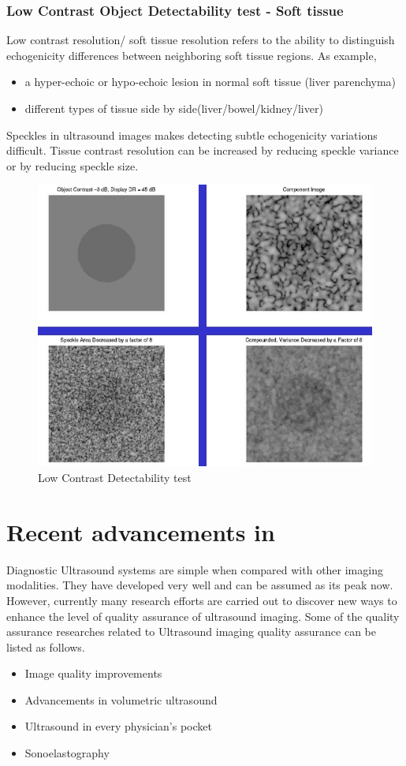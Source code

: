 \documentclass[12pt]{article}
\makeatletter
\let\thetitle\@title
\makeatother
\begin{document}
\subsubsection{Low Contrast Object Detectability test - Soft tissue}
Low contrast resolution/ soft tissue resolution refers to the ability to distinguish echogenicity differences between neighboring soft tissue regions. 
As example,
\begin{itemize}
    \item a hyper-echoic or hypo-echoic lesion in normal soft tissue (liver parenchyma)
    \item different types of tissue side by side(liver/bowel/kidney/liver)
\end{itemize}

Speckles in ultrasound images makes detecting subtle echogenicity variations difficult. Tissue contrast resolution can be increased by reducing speckle variance or by reducing speckle size.
\begin{figure}[!h]
    \centering
    \includegraphics[width=0.8\linewidth]{low.jpg}
    \caption{\small{Low Contrast Detectability test}}
    \label{fig:Low Contrast Detectability test}
\end{figure}

\pagebreak
\section{Recent advancements in \thetitle}
Diagnostic Ultrasound systems are simple when compared with other imaging modalities. They have developed very well and can be assumed as its peak now. However, currently many research efforts are carried out to discover new ways to enhance the level of quality assurance of ultrasound imaging. Some of the quality assurance researches related to Ultrasound imaging quality assurance can be listed as follows. 
\begin{itemize}
    \item Image quality improvements
    \item Advancements in volumetric ultrasound
    \item Ultrasound in every physician’s pocket
    \item Sonoelastography
\end{itemize}
\end{document}
